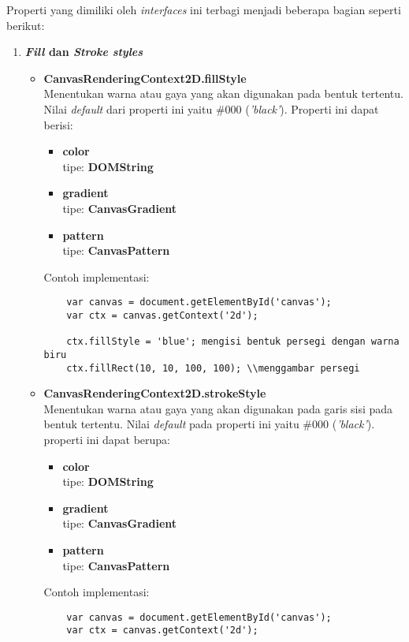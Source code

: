 Properti yang dimiliki oleh \textit{interfaces} ini terbagi menjadi beberapa bagian seperti berikut:
\begin{enumerate}
	\item \textbf{\textit{Fill} dan \textit{Stroke styles}}
	\begin{itemize}
		\item \textbf{CanvasRenderingContext2D.fillStyle} \\ Menentukan warna atau gaya yang akan digunakan pada bentuk tertentu. Nilai \textit{default} dari properti ini yaitu \#000 (\textit{'black'}). Properti ini dapat berisi:
		\begin{itemize}
			\item \textbf{color} \\tipe: \textbf{DOMString} 
			\item \textbf{gradient} \\tipe: \textbf{CanvasGradient}
			\item \textbf{pattern} \\tipe: \textbf{CanvasPattern}
		\end{itemize}
		Contoh implementasi:
	\begin{lstlisting}
	var canvas = document.getElementById('canvas');
	var ctx = canvas.getContext('2d');
	
	ctx.fillStyle = 'blue'; mengisi bentuk persegi dengan warna biru
	ctx.fillRect(10, 10, 100, 100);	\\menggambar persegi
	\end{lstlisting}
		
		\item \textbf{CanvasRenderingContext2D.strokeStyle} \\ Menentukan warna atau gaya yang akan digunakan pada garis sisi pada bentuk tertentu. Nilai \textit{default} pada properti ini yaitu \#000 (\textit{'black'}). properti ini dapat berupa:
		\begin{itemize}
			\item \textbf{color} \\tipe: \textbf{DOMString} 
			\item \textbf{gradient} \\tipe: \textbf{CanvasGradient}
			\item \textbf{pattern} \\tipe: \textbf{CanvasPattern}
		\end{itemize}
		 Contoh implementasi:
	\begin{lstlisting}
	var canvas = document.getElementById('canvas');
	var ctx = canvas.getContext('2d');
		 

\end{lstlisting}
\end{itemize}
\end{enumerate}
